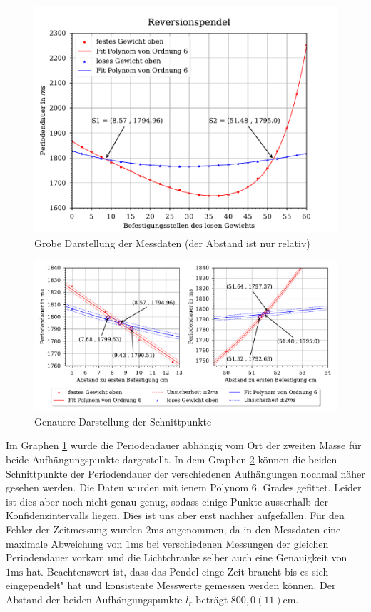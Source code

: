 \documentclass[11pt, a4paper]{article}
\begin{document}
    \begin{figure}[ht]
        \centering
        \includegraphics[width=120mm]{./Reversion_grob.pdf}

        \caption{Grobe Darstellung der Messdaten (der Abstand ist nur relativ)}
        \label{fig:revgrob}
    \end{figure}
    \begin{figure}[htb]
        \centering
        \includegraphics[width=\textwidth]{./Reversion_fein.pdf}

        \caption{Genauere Darstellung der Schnittpunkte}
        \label{fig:revfein1}
    \end{figure}

    Im Graphen \ref{fig:revgrob} wurde die Periodendauer abhängig vom Ort der zweiten Masse für beide Aufhängungspunkte dargestellt. 
    In dem Graphen \ref{fig:revfein1}  können die beiden Schnittpunkte der Periodendauer der verschiedenen
    Aufhängungen nochmal näher gesehen werden. Die Daten wurden mit ienem Polynom 6. Grades gefittet.
    Leider ist dies aber noch nicht genau genug, sodass einige Punkte ausserhalb
    der Konfidenzintervalls liegen. Dies ist uns aber erst nachher aufgefallen. Für den Fehler der Zeitmessung
    wurden $2 \si{\milli\second}$ angenommen, da in den Messdaten eine maximale Abweichung von $1\si{\milli\second}$ bei verschiedenen Messungen 
    der gleichen Periodendauer vorkam und die Lichtchranke selber auch eine Genauigkeit von $1\si{\milli\second}$ hat.
    Beachtenswert ist, dass das Pendel einge Zeit braucht bis es sich eingependelt" hat und konsistente Messwerte
    gemessen werden können. Der Abstand der beiden Aufhängungspunkte $l_r$ beträgt $800,0(11)\si{\centi\metre}$.
\end{document}
